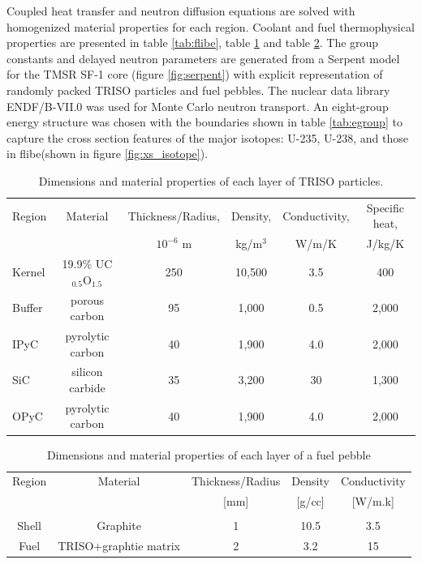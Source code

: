 \documentclass{elsarticle}
\begin{document}
Coupled heat transfer and neutron diffusion equations are solved with homogenized material properties for each region. Coolant and fuel thermophysical properties are presented in table \ref{tab:flibe}, table \ref{tab:TRISO_prop} and table \ref{tab:pb_prop}. The group constants and delayed neutron parameters are generated from a Serpent model for the TMSR SF-1 core (figure \ref{fig:serpent}) with explicit representation of randomly packed TRISO particles and fuel pebbles. The nuclear data library ENDF/B-VII.0 was used for Monte Carlo neutron transport. 
An eight-group energy structure was chosen with the boundaries shown in table \ref{tab:egroup} to capture the cross section features of the major isotopes: U-235, U-238, and those in flibe(shown in figure \ref{fig:xs_isotope}). 

\begin{table}
  \caption{Dimensions and material properties of each layer of TRISO particles.}
  \begin{tabular}[h]{lccccc}
    \hline
    Region&Material&Thickness/Radius,&Density,&Conductivity,&Specific heat,\\
    &&$10^{-6}$ m&kg/m$^3$&W/m/K&J/kg/K\\
    \hline
    Kernel&19.9\% UC$_{0.5}$O$_{1.5}$&250&10,500&3.5&400\\
    Buffer&porous carbon&95&1,000&0.5&2,000\\
    IPyC&pyrolytic carbon&40&1,900&4.0&2,000\\
    SiC&silicon carbide&35&3,200&30&1,300\\
    OPyC&pyrolytic carbon&40&1,900&4.0&2,000\\
    \hline
  \end{tabular}
  \label{tab:TRISO_prop}
\end{table}


\begin{table}
  \begin{tabular}[h]{ccccc}
    Region&Material&Thickness/Radius&Density&Conductivity\\
    &&[mm]&[g/cc]&[W/m.k] \\
    \hline\\
    Shell&Graphite&1&10.5&3.5\\
    Fuel&TRISO+graphtie matrix&2&3.2&15\\
  \end{tabular}
  \caption{Dimensions and material properties of each layer of a fuel pebble}
  \label{tab:pb_prop}
\end{table}
\end{document}
